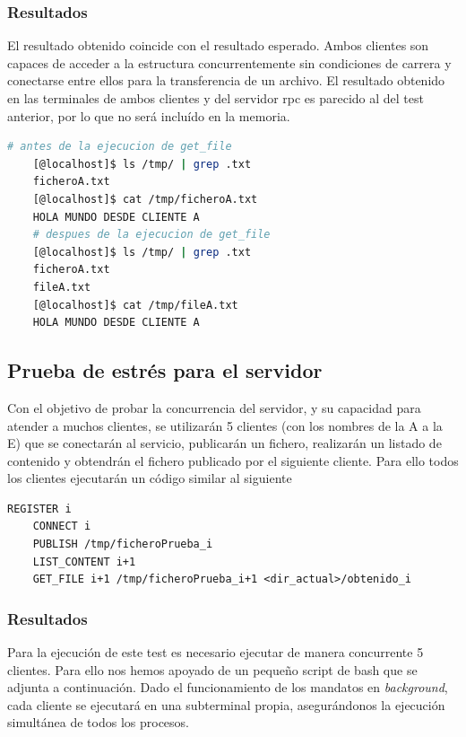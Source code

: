 \documentclass[]{article}
\begin{document}
\subsubsection{Resultados}
\label{subsubsection:resultados_2_clientes}
El resultado obtenido coincide con el resultado esperado. Ambos clientes son capaces de acceder a la estructura concurrentemente sin condiciones de carrera y conectarse entre ellos para la transferencia de un archivo. El resultado obtenido en las terminales de ambos clientes y del servidor rpc es parecido al del test anterior, por lo que no será incluído en la memoria. 

\begin{lstlisting}[caption=Resultado de la transferencia del archivo, language=bash]
    # antes de la ejecucion de get_file
    [@localhost]$ ls /tmp/ | grep .txt
    ficheroA.txt
    [@localhost]$ cat /tmp/ficheroA.txt
    HOLA MUNDO DESDE CLIENTE A
    # despues de la ejecucion de get_file
    [@localhost]$ ls /tmp/ | grep .txt
    ficheroA.txt
    fileA.txt
    [@localhost]$ cat /tmp/fileA.txt
    HOLA MUNDO DESDE CLIENTE A
\end{lstlisting}

\subsection{Prueba de estrés para el servidor}
\label{subsec:estres}
Con el objetivo de probar la concurrencia del servidor, y su capacidad para atender a muchos clientes, se utilizarán 5 clientes (con los nombres de la A a la E) que se conectarán al servicio, publicarán un fichero, realizarán un listado de contenido y obtendrán el fichero publicado por el siguiente cliente.
Para ello todos los clientes ejecutarán un código similar al siguiente
\begin{lstlisting}[caption=Operaciones a realizar por cada cliente i]
    REGISTER i
    CONNECT i
    PUBLISH /tmp/ficheroPrueba_i
    LIST_CONTENT i+1 
    GET_FILE i+1 /tmp/ficheroPrueba_i+1 <dir_actual>/obtenido_i
\end{lstlisting}

\subsubsection{Resultados}
\label{subsubsection:resultados_5_clientes}
Para la ejecución de este test es necesario ejecutar de manera concurrente 5 clientes. Para ello nos hemos apoyado de un pequeño script de bash que se adjunta a continuación. Dado el funcionamiento de los mandatos en \textit{background}, cada cliente se ejecutará en una subterminal propia, asegurándonos la ejecución simultánea de todos los procesos. 
\end{document}
